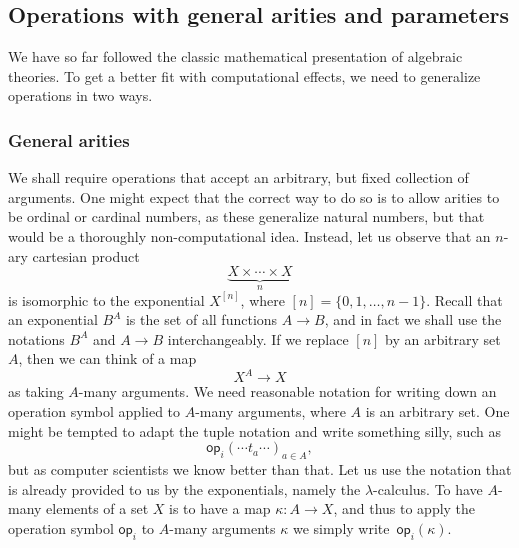 \documentclass{amsart}
\newcommand{\set}[1]{\{#1\}} %
\newcommand{\op}[1]{\mathsf{op}_{#1}} %
\begin{document}
\subsection{Operations with general arities and parameters}
\label{sec:oper-gener-arit-param}

We have so far followed the classic mathematical presentation of algebraic
theories. To get a better fit with computational effects, we need to generalize
operations in two ways.

\subsubsection{General arities}
\label{sec:general-arities}

We shall require operations that accept an arbitrary, but fixed collection of
arguments. One might expect that the correct way to do so is to allow arities to
be ordinal or cardinal numbers, as these generalize natural numbers, but that
would be a thoroughly non-computational idea. Instead, let us observe that an
$n$-ary cartesian product
%
\begin{equation*}
  \underbrace{X \times \cdots \times X}_{n}
\end{equation*}
%
is isomorphic to the exponential $X^{[n]}$, where
$[n] = \set{0, 1, \ldots, n-1}$. Recall that an exponential $B^A$ is the set of
all functions $A \to B$, and in fact we shall use the notations $B^A$ and
$A \to B$ interchangeably. If we replace $[n]$ by an arbitrary set~$A$, then we
can think of a map
%
\begin{equation*}
  X^A \to X
\end{equation*}
%
as taking $A$-many arguments. We need reasonable notation for writing down an
operation symbol applied to $A$-many arguments, where $A$ is an arbitrary set. One
might be tempted to adapt the tuple notation and write something silly, such as
%
\begin{equation*}
  \op{i}(\cdots t_a \cdots)_{a \in A},
\end{equation*}
%
but as computer scientists we know better than that. Let us use the notation that
is already provided to us by the exponentials, namely the $\lambda$-calculus. To
have $A$-many elements of a set $X$ is to have a map $\kappa : A \to X$, and
thus to apply the operation symbol $\op{i}$ to $A$-many arguments $\kappa$ we
simply write~$\op{i}(\kappa)$.
\end{document}
